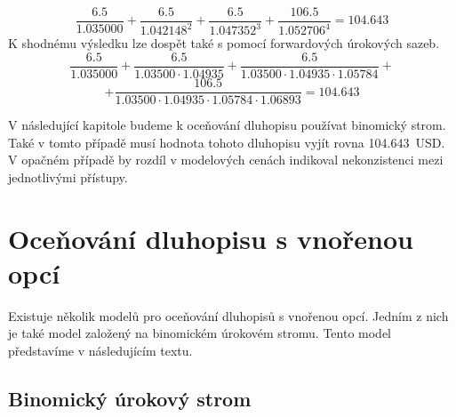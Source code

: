 \documentclass[a4paper]{book}
\begin{document}
\begin{equation*}
\frac{6.5}{1.035000} + \frac{6.5}{1.042148^2} + \frac{6.5}{1.047352^3} + \frac{106.5}{1.052706^4} = 104.643
\end{equation*}
K shodnému výsledku lze dospět také s pomocí forwardových úrokových sazeb.
\begin{equation*}
\frac{6.5}{1.035000} + \frac{6.5}{1.03500 \cdot 1.04935} + \frac{6.5}{1.03500 \cdot 1.04935 \cdot 1.05784} +
\end{equation*}
\begin{equation*}
+ \frac{106.5}{1.03500 \cdot 1.04935 \cdot 1.05784 \cdot 1.06893} = 104.643
\end{equation*}

V následující kapitole budeme k oceňování dluhopisu používat binomický strom. Také v tomto případě musí hodnota tohoto dluhopisu vyjít rovna 104.643~USD. V opačném případě by rozdíl v modelových cenách indikoval nekonzistenci mezi jednotlivými přístupy.

\section{Oceňování dluhopisu s vnořenou opcí}

Existuje několik modelů pro oceňování dluhopisů s vnořenou opcí. Jedním z nich je také model založený na binomickém úrokovém stromu. Tento model představíme v následujícím textu.

\subsection{Binomický úrokový strom}
\end{document}
